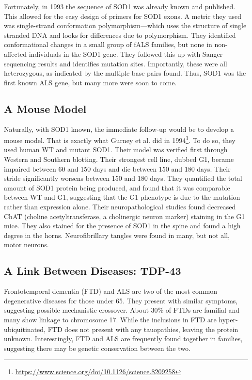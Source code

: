 Fortunately, in 1993 the sequence of SOD1 was already known and published. This allowed for the easy design of primers for SOD1 exons. A metric they used was single-strand conformation polymorphism---which uses the structure of single stranded DNA and looks for differences due to polymorphism. They identified conformational changes in a small group of fALS families, but none in non-affected individuals in the SOD1 gene. They followed this up with Sanger sequencing results and identifies mutation sites. Importantly, these were all heterozygous, as indicated by the multiple base pairs found. Thus, SOD1 was the first known ALS gene, but many more were soon to come.

\subsection*{A Mouse Model}

Naturally, with SOD1 known, the immediate follow-up would be to develop a mouse model. That is exactly what Gurney et al. did in 1994\footnote{\url{https://www.science.org/doi/10.1126/science.8209258}}. To do so, they used human WT and mutant SOD1. Their model was verified first through Western and Southern blotting. Their strongest cell line, dubbed G1, became impaired between 60 and 150 days and die between 150 and 180 days. Their stride significantly worsens between 150 and 180 days. They quantified the total amount of SOD1 protein being produced, and found that it was comparable between WT and G1, suggesting that the G1 phenotype is due to the mutation rather than expression alone. Their neuropathological studies found decreased ChAT (choline acetyltransferase, a cholinergic neuron marker) staining in the G1 mice. They also stained for the presence of SOD1 in the spine and found a high degree in the horns. Neurofibrillary tangles were found in many, but not all, motor neurons. 

\subsection*{A Link Between Diseases: TDP-43}


Frontotemporal dementia (FTD) and ALS are two of the most common degenerative diseases for those under 65. They present with similar symptoms, suggesting possible mechanistic crossover. About 30\% of FTDs are familial and many show linkage to chromosome 17. While the inclusions in FTD are hyper-ubiquitinated, FTD does not present with any tauopathies, leaving the protein unknown. Interestingly, FTD and ALS are frequently found together in families, suggesting there may be genetic conservation between the two.\newline

